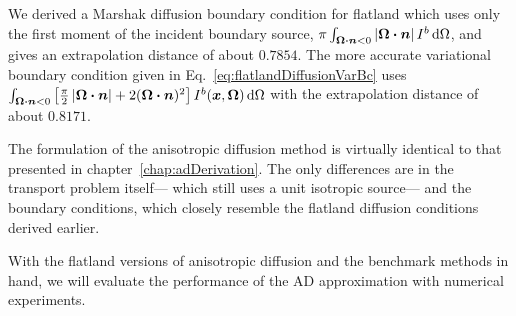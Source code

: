 We derived a Marshak diffusion boundary condition for flatland which uses only
the first moment of the incident boundary source, $\pi
\int_{\bm{\Omega}\bm{\cdot} \bm{n} < 0 } \left| \bm{\Omega}\bm{\cdot} \bm{n} \right| I^b
\mathop{}\!\mathrm{d}\Omega$, and gives an extrapolation distance of about $0.7854$.
The more accurate variational boundary condition given in
Eq.~\eqref{eq:flatlandDiffusionVarBc} uses $\int_{\bm{\Omega}\bm{\cdot}\bm{n} < 0}
\left[ \frac{\pi}{2} \left| \bm{\Omega}\bm{\cdot}\bm{n} \right| + 2 (\bm{\Omega}\bm{\cdot}\bm{n})^2
\right] I^b(\bm{x}, \bm{\Omega}) \mathop{}\!\mathrm{d}\Omega$ with the extrapolation
distance of about $0.8171$.

The formulation of the anisotropic diffusion method is virtually identical to
that presented in chapter~\ref{chap:adDerivation}. The only differences are in
the transport problem itself---%
which still uses a unit isotropic source---%
and the boundary conditions, which closely resemble the flatland diffusion
conditions derived earlier.

With the flatland versions of anisotropic diffusion and the benchmark methods in
hand, we will evaluate the performance of the AD approximation with numerical
experiments.


